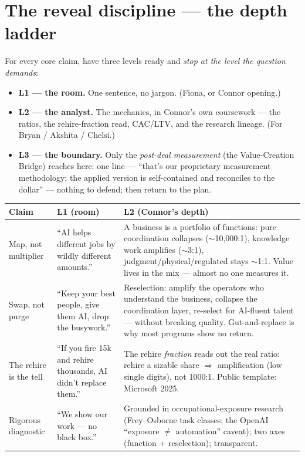 \documentclass[11pt]{article}
\begin{document}
\section{The reveal discipline --- the depth ladder}
For every core claim, have three levels ready and \emph{stop at the level the question
demands}:
\begin{itemize}
  \item \textbf{L1 --- the room.} One sentence, no jargon. (Fiona, or Connor opening.)
  \item \textbf{L2 --- the analyst.} The mechanics, in Connor's own coursework --- the ratios,
  the rehire-fraction read, CAC/LTV, and the research lineage. (For Bryan / Akshita / Chelsi.)
  \item \textbf{L3 --- the boundary.} Only the \emph{post-deal measurement} (the Value-Creation
  Bridge) reaches here: one line --- ``that's our proprietary measurement methodology; the applied
  version is self-contained and reconciles to the dollar'' --- nothing to defend; then return to
  the plan.
\end{itemize}

\begin{center}
\renewcommand{\arraystretch}{1.35}\small
\begin{tabular}{p{2.7cm} p{4.3cm} p{4.4cm}}
\toprule
\textbf{Claim} & \textbf{L1 (room)} & \textbf{L2 (Connor's depth)} \\
\midrule
Map, not multiplier & ``AI helps different jobs by wildly different amounts.'' & A business is a portfolio of functions: pure coordination collapses ($\sim$10{,}000:1), knowledge work amplifies ($\sim$3:1), judgment/physical/regulated stays $\sim$1:1. Value lives in the mix --- almost no one measures it. \\
Swap, not purge & ``Keep your best people, give them AI, drop the busywork.'' & Reselection: amplify the operators who understand the business, collapse the coordination layer, re-select for AI-fluent talent --- without breaking quality. Gut-and-replace is why most programs show no return. \\
The rehire is the tell & ``If you fire 15k and rehire thousands, AI didn't replace them.'' & The rehire \emph{fraction} reads out the real ratio: rehire a sizable share $\Rightarrow$ amplification (low single digits), not 1000:1. Public template: Microsoft 2025. \\
Rigorous diagnostic & ``We show our work --- no black box.'' & Grounded in occupational-exposure research (Frey--Osborne task classes; the OpenAI ``exposure $\neq$ automation'' caveat); two axes (function $+$ reselection); transparent. \\
\bottomrule
\end{tabular}
\end{center}
\end{document}
